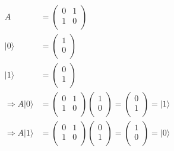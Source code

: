 \documentclass{article}
\begin{document}
\begin{equation}
    \begin{split}
        A & = \begin{pmatrix}
            0 & 1 \\ 1 & 0 \\
        \end{pmatrix} \\
        |0\rangle & = \begin{pmatrix}
            1 \\ 0 \\
        \end{pmatrix} \\
        |1\rangle & = \begin{pmatrix}
            0 \\ 1 \\
        \end{pmatrix} \\
        \Longrightarrow A|0\rangle & = \begin{pmatrix}
            0 & 1 \\ 1 & 0 \\
        \end{pmatrix} \begin{pmatrix}
            1 \\ 0 \\
        \end{pmatrix} = \begin{pmatrix}
            0 \\ 1 \\
        \end{pmatrix} = |1\rangle \\
        \Longrightarrow A|1\rangle & = \begin{pmatrix}
            0 & 1 \\ 1 & 0 \\
        \end{pmatrix} \begin{pmatrix}
            0 \\ 1 \\
        \end{pmatrix} = \begin{pmatrix}
            1 \\ 0 \\
        \end{pmatrix} = |0\rangle \\
    \end{split}
\end{equation}
\end{document}
